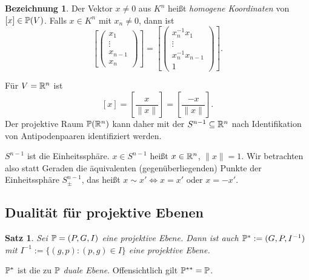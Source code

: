 \documentclass[
 a4paper,
 12pt,
 parskip=half
 ]{scrartcl}
\theoremstyle{plain}
\newtheorem{thm}{Satz}[section] %
\theoremstyle{definition}
\newtheorem*{deno*}{Bezeichnung}
\begin{document}
\begin{deno*}
 Der Vektor $x \ne 0$ aus $K^n$ heißt \emph{homogene Koordinaten} von $[x] \in \mathbb{P}(V)$. Falls $x \in K^n$ mit $x_n \ne 0$, dann ist
 \[ \left[ \begin{pmatrix} x_1 \\ \vdots \\ x_{n-1} \\ x_n \end{pmatrix} \right] =
    \left[ \begin{pmatrix} x_n^{-1} x_1 \\ \vdots \\ x_n^{-1} x_{n-1} \\ 1 \end{pmatrix} \right]. \]
\end{deno*}

Für $V = \mathbb{R}^n$ ist
\[ [x] = \left[ \frac{x}{\|x\|} \right] = \left[ \frac{-x}{\|x\|} \right]. \]
Der projektive Raum $\mathbb{P}(\mathbb{R}^n)$ kann daher mit der $S^{n-1} \subseteq \mathbb{R}^n$ nach Identifikation von Antipodenpaaren identifiziert werden.
 
$S^{n-1}$ ist die Einheitssphäre. $x \in S^{n-1}$ heißt $x \in \mathbb{R}^n$, $\| x \| = 1$. Wir betrachten also statt Geraden die äquivalenten (gegenüberliegenden) Punkte der Einheitssphäre $S^{n-1}_\pm$, das heißt $x \sim x' \Leftrightarrow x = x'$ oder $x = -x'$.

\subsection*{Dualität für projektive Ebenen}
\begin{thm}
 Sei $\mathbb{P} = (P,G,I)$ eine projektive Ebene. Dann ist auch $\mathbb{P}^* := (G,P,I^{-1})$ mit $I^{-1} := \{ (g,p) : (p,g) \in I \}$ eine projektive Ebene.
\end{thm}

$\mathbb{P}^*$ ist die zu $\mathbb{P}$ \emph{duale Ebene}. Offensichtlich gilt $\mathbb{P}^{**} = \mathbb{P}$.
\end{document}
